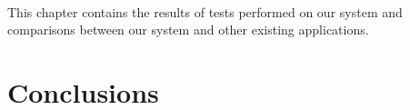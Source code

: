 \paragraph{}
This chapter contains the results of tests performed on our system and 
comparisons between our system and other existing applications.
\section{Conclusions}